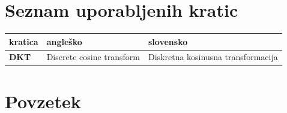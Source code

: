 \documentclass[a4paper, 12pt]{book}
\newcommand{\clearemptydoublepage}{\newpage{\pagestyle{empty}\cleardoublepage}}
\begin{document}
\clearemptydoublepage



\pagestyle{empty}
\def\thepage{}%
\tableofcontents{}


\clearemptydoublepage


\chapter*{Seznam uporabljenih kratic}  %

\noindent\begin{tabular}{p{}|p{}|p{}}    %
  {\bf kratica} & {\bf angleško}  & {\bf slovensko} \\ \hline
  {\bf DKT}      & Discrete cosine transform               & Diskretna kosinusna transformacija \\
  
\end{tabular}


\clearemptydoublepage

\chapter*{Povzetek}
\end{document}
